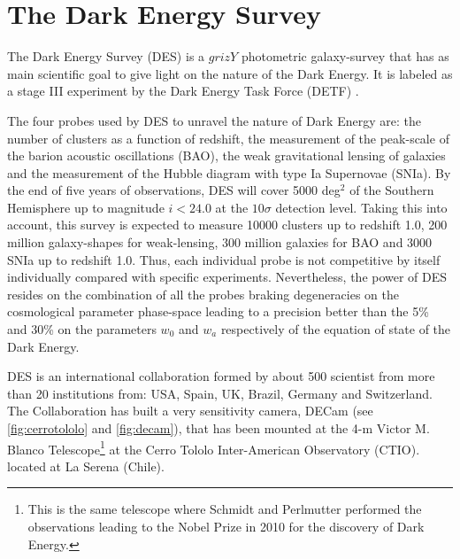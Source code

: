 \chapter{The Dark Energy Survey}
\label{ch:DES}

The Dark Energy Survey (DES) \cite{2005astro.ph.10346T} is a $grizY$ photometric galaxy-survey that has as main scientific goal to give light on the nature of the Dark Energy. It is labeled as a stage III experiment by the Dark Energy Task Force (DETF) \cite{2006astro.ph..9591A}.
\newline

The four probes used by DES to unravel the nature of Dark Energy are: the number of clusters as a function of redshift, the measurement of the peak-scale of the barion acoustic oscillations (BAO), the weak gravitational lensing of galaxies and the measurement of the Hubble diagram with type Ia Supernovae (SNIa). By the end of five years of observations, DES will cover 5000 deg$^2$ of the Southern Hemisphere up to magnitude $i<24.0$ at the $10\sigma$ detection level. Taking this into account, this survey is expected to measure 10000 clusters up to redshift 1.0, 200 million galaxy-shapes for weak-lensing, 300 million galaxies for BAO and 3000 SNIa up to redshift 1.0. Thus, each individual probe is not competitive by itself individually compared with specific experiments. Nevertheless, the power of DES resides on the combination of all the probes braking degeneracies on the cosmological parameter phase-space leading to a precision better than the 5\% and 30\% on the parameters $w_0$ and $w_a$ respectively of the equation of state of the Dark Energy.
\newline

DES is an international collaboration formed by about 500 scientist from more than 20 institutions from: USA, Spain, UK, Brazil, Germany and Switzerland. The Collaboration has built a very sensitivity camera, DECam (see \autoref{fig:cerrotololo} and \autoref{fig:decam}), that has been mounted at the 4-m Victor M. Blanco Telescope\footnote{This is the same telescope where Schmidt and Perlmutter performed the observations leading to the Nobel Prize in 2010 for the discovery of Dark Energy.} at the Cerro Tololo Inter-American Observatory (CTIO). located at La Serena (Chile).

